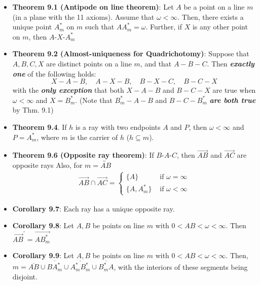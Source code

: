 \documentclass{report}
\begin{document}
\begin{itemize}
        \item \textbf{Theorem 9.1 (Antipode on line theorem)}: Let $A$ be a point on a line $m$ (in a plane with the 11 axioms). Assume that $\omega < \infty$. Then, there exists a unique point $A^{*}_{m}$ on $m$ such that $AA_{m}^{*} = \omega$. Further, if $X$ is any other point on $m$, then $ A\text{-}X\text{-}A^{*}_{m} $
        \item \textbf{Theorem 9.2 (Almost-uniqueness for Quadrichotomy)}:  
            Suppose that \( A, B, C, X \) are distinct points on a line \( m \),  
            and that \( A - B - C \). Then \textbf{\textit{exactly one}} of the following holds:  
            \[
                X - A - B, \quad A - X - B, \quad B - X - C, \quad B - C - X
            \]
            with the \textbf{\textit{only exception}} that both \( X - A - B \) and \( B - C - X \) are true  
            when \( \omega < \infty \) and \( X = B_m^* \).
            \bigbreak \noindent 
            (Note that \( B_m^* - A - B \) and \( B - C - B_m^* \) \textbf{\textit{are both true}} by Thm. 9.1)
        \item \textbf{Theorem 9.4}.
            If \( h \) is a ray with two endpoints \( A \) and \( P \),  
            then \( \omega < \infty \) and \( P = A_m^* \), where \( m \) is the carrier of \( h \) (\( h \subseteq m \)).
        \item \textbf{Theorem 9.6 (Opposite ray theorem)}: If $ B\text{-}A\text{-}C$, then $\overrightarrow{AB}$ and $\overrightarrow{AC}$ are opposite rays
            \bigbreak \noindent 
            Also, for $m = \overleftrightarrow{AB}$
            \begin{align*}
                \overrightarrow{AB} \cap \overrightarrow{AC} = 
                \begin{cases}
                    \{A\}     & \text{ if } \omega = \infty \\
                    \{A, A_{m}^{*}\}     & \text{ if } \omega<\infty
                \end{cases}
            \end{align*}
        \item \textbf{Corollary 9.7}: Each ray has a unique opposite ray.
        \item \textbf{Corollary 9.8}: Let $A,B$ be points on line $m$ with $0 <AB<\omega <\infty$. Then $\overrightarrow{AB}^{\prime} = \overrightarrow{AB_{m}^{*}} $
        \item \textbf{Corollary 9.9}: Let $A,B$ be points on line $m$ with $ 0 < AB < \omega < \infty$. Then, $ m = \overline{AB} \cup \overline{BA_{m}^{*}} \cup \overline{A_{m}^{*}B_{m}^{*}} \cup \overline{B_{m}^{*}A}$, with the interiors of these segments being disjoint.

\end{itemize}
\end{document}
